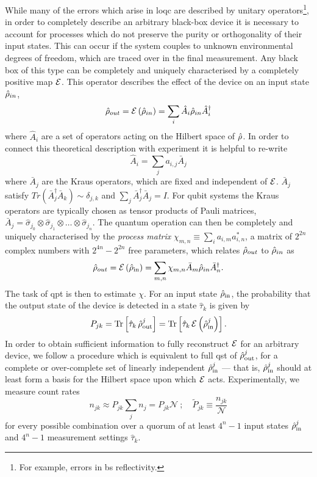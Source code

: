 While many of the errors which arise in \gls{loqc} are described by unitary operators\footnote{For example, errors in \gls{bs} reflectivity.}, in order to completely describe an arbitrary black-box device it is necessary to account for processes which do not preserve the purity or orthogonality of their input states. This can occur if the system couples to unknown environmental degrees of freedom, which are traced over in the final measurement. Any black box of this type can be completely and uniquely characterised by a completely positive map  $\mathcal{E}$. This operator describes the effect of the device on an input state $\hat{\rho}_{in}$,
\begin{equation}
    \hat{\rho}_{out} = \mathcal{E}\left( \hat{\rho}_{in} \right) = \sum_i \hat{A}_i \hat{\rho}_{in} \hat{A}_i^{\dagger}
\end{equation}
where $\hat{A}_i$ are a set of operators acting on the Hilbert space of $\hat{\rho}$. In order to connect this theoretical description with experiment it is helpful to re-write 
\begin{equation}
    \hat{A}_i = \sum_j a_{i,j} \bar{A}_j
\end{equation}
where $\bar{A}_j$ are the Kraus operators, which are fixed and independent of $\mathcal{E}$. $\bar{A}_j$ satisfy $Tr (\bar{A}^{\dagger}_j \bar{A}_k ) \sim \delta_{j,k}$ and $\sum_j\bar{A}_j^{\dagger}\bar{A}_j = I$. For qubit systems the Kraus operators are typically chosen as tensor products of Pauli matrices, $\bar{A}_j = \hat{\sigma}_{j_0} \otimes \hat{\sigma}_{j_1} \otimes \ldots \otimes \hat{\sigma}_{j_n}$.
The quantum operation can then be completely and uniquely characterised by the \emph{process matrix} $\chi_{m,n} \equiv \sum_i{a_{i,m} a_{i,n}^{*}}$, a matrix of $2^{2n}$ complex numbers with $2^{4n}-2^{2n}$ free parameters, 
which relates $\hat{\rho}_{out}$ to $\hat{\rho}_{in}$ as 
\begin{equation}
    \hat{\rho}_{out} = \mathcal{E}\left(\hat{\rho}_{\mathrm{in}} \right) = \sum_{m,n} \chi_{m,n} \bar{A}_{m} \hat{\rho}_{in} \bar{A}_{n}^{\dagger}.
\end{equation}
The task of \gls{qpt} is then to estimate $\chi$. 
For an input state $\hat{\rho}_{\mathrm{in}}$, the probability that the output state of the device is detected in a state $\hat{\tau}_k$ is given by
\begin{equation}
    P_{jk} = 
    \mathrm{Tr} 
    \left[ \hat{\tau}_k \, \hat{\rho}_{\mathrm{out}}^j \right]  = 
    \mathrm{Tr} 
    \left[ \hat{\tau}_k \, \mathcal{E} \left( \hat{\rho}_{\mathrm{in}}^j \right) \right] .
\end{equation}
In order to obtain sufficient information to fully reconstruct $\mathcal{E}$ for an arbitrary device, we follow a procedure which is equivalent to full \gls{qst} of $\hat{\rho}_{\mathrm{out}}^j$, for a complete or over-complete set of linearly independent $\hat{\rho}_{\mathrm{in}}^j$ --- that is, $\hat{\rho}_{\mathrm{in}}^j$ should at least form a basis for the Hilbert space upon which $\mathcal{E}$ acts. 
Experimentally, we measure count rates 
\begin{equation}
    n_{jk} \approx P_{jk} \sum_j n_j = P_{jk} \mathcal{N}~;
    \quad
    \tilde{P}_{jk} \equiv \frac{n_{jk}}{\mathcal{N}}
\end{equation}
for every possible combination over a quorum of at least $4^n-1$ input states $\hat{\rho}_{\mathrm{in}}^j$ and $4^n-1$ measurement settings $\hat{\tau}_k$. 

